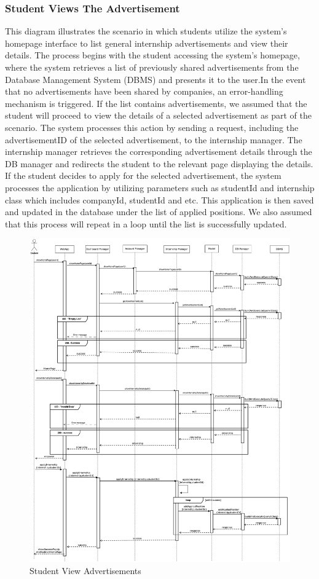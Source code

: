 \documentclass[a4paper,12pt]{article}
\begin{document}
\subsubsection*{ Student Views The Advertisement} 
This diagram illustrates the scenario in which students utilize the system’s homepage interface to list general internship advertisements and view their details. The process begins with the student accessing the system’s homepage, where the system retrieves a list of previously shared advertisements from the Database Management System (DBMS) and presents it to the user.In the event that no advertisements have been shared by companies, an error-handling mechanism is triggered. If the list contains advertisements, we assumed that the student will proceed to view the details of a selected advertisement as part of the scenario. The system processes this action by sending a request, including the advertisementID of the selected advertisement, to the internship manager. The internship manager retrieves the corresponding advertisement details through the DB manager and redirects the student to the relevant page displaying the details. If the student decides to apply for the selected advertisement, the system processes the application by utilizing parameters such as studentId and internship class which includes companyId, studentId and etc. This application is then saved and updated in the database under the list of applied positions. We also assumed that this process will repeat in a loop until the list is successfully updated.
\begin{figure}[H]
    \centering
    \includegraphics[scale = 0.25]{DD_figures/RuntimeView/studentViewInternship.drawio.png}
    \caption{Student View Advertisements}
    \centering
\end{figure}
\newpage
\end{document}
